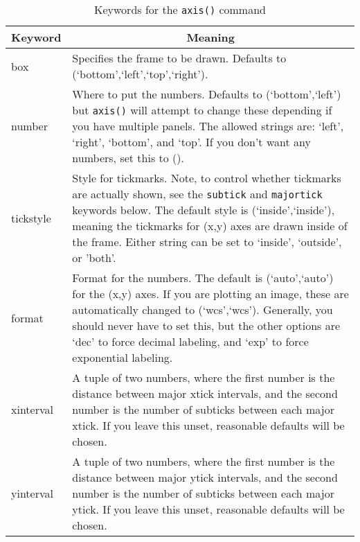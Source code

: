\documentclass[12pt]{article}
\begin{document}
\begin{table}
\caption{\label{tab:axis} Keywords for the \texttt{axis()} command}
\begin{center}
\begin{tabular}{lp{4in}}
\hline
\hline
\multicolumn{1}{c}{Keyword} & \multicolumn{1}{c}{Meaning}\\
\hline
box       & Specifies the frame to be drawn.  Defaults to
            \mbox{(`bottom',`left',`top',`right')}.\\
number    & Where to put the numbers.  Defaults to (`bottom',`left')
            but \texttt{axis()} will attempt to change these depending if you
            have multiple panels.  The allowed strings are: `left', `right', 
            `bottom', and `top'.  If you don't want any numbers, set this to ().\\
tickstyle & Style for tickmarks.  Note, to control whether tickmarks
            are actually shown, see the \texttt{subtick} and \texttt{majortick}
            keywords below.  The default style is (`inside',`inside'), meaning
            the tickmarks for (x,y) axes are drawn inside of the
            frame.  Either string can be set to `inside', `outside',
            or 'both'.\\
format    & Format for the numbers.  The default is (`auto',`auto')
            for the (x,y) axes.  If you are plotting an image, these
            are automatically changed to (`wcs',`wcs').  Generally, you should
            never have to set this, but the other options are `dec'
            to force decimal labeling, and `exp' to force exponential
            labeling.\\
xinterval & A tuple of two numbers, where the first number is the
            distance between major xtick intervals, and the second
            number is the number of subticks between each major xtick.
            If you leave this unset, reasonable defaults will be
            chosen.\\
yinterval & A tuple of two numbers, where the first number is the
            distance between major ytick intervals, and the second
            number is the number of subticks between each major ytick.
            If you leave this unset, reasonable defaults will be
            chosen.\\
\hline
\end{tabular}
\end{center}
\end{table}

\setcounter{table}{0} %
\end{document}
